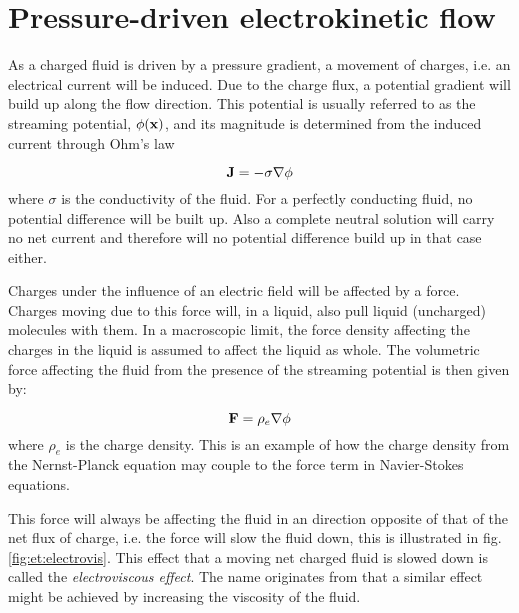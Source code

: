 \section{Pressure-driven electrokinetic flow}\label{sec:et:streaming_pot}
As a charged fluid is driven by a pressure gradient, a movement of
charges, i.e. an electrical current will be induced. Due to the charge
flux, a potential gradient will build up along the flow
direction. This potential is usually referred to as the streaming
potential, $\phi(\mathbf{x})$, and its magnitude is determined from the
induced current through Ohm's law

\begin{equation}
\mathbf{J} = -  \sigma \nabla \phi  
\end{equation}   
where $\sigma$ is the conductivity of the fluid. For a perfectly
conducting fluid, no potential difference will be built up. Also a
complete neutral solution will carry no net current and therefore will
no potential difference build up in that case either.

Charges under the influence of an electric field will be affected by a
force. Charges moving due to this force will, in a liquid, also pull
liquid (uncharged) molecules with them. In a macroscopic limit, the
force density affecting the charges in the liquid is assumed to affect
the liquid as whole. The volumetric force affecting the fluid from
the presence of the streaming potential is then given by:

\begin{equation}
\mathbf{F} = \rho_e \nabla \phi
\end{equation}
where $\rho_e$ is the charge density. This is an example of how the
charge density from the Nernst-Planck equation may couple to the force
term in Navier-Stokes equations. 

This force will always be affecting the fluid in an direction opposite
of that of the net flux of charge, i.e. the force will slow the fluid
down, this is illustrated in fig. \ref{fig:et:electrovis}. This effect
that a moving net charged fluid is slowed down is called the
\emph{electroviscous effect}. The name originates from that a similar
effect might be achieved by increasing the viscosity of the fluid.

